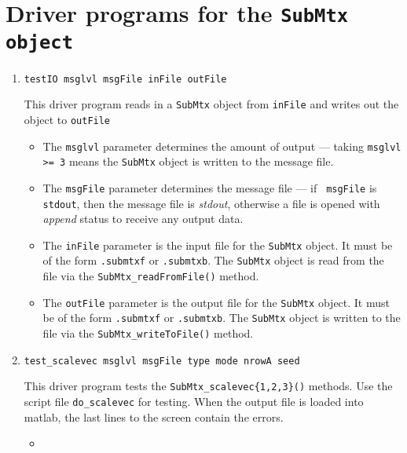\par
\section{Driver programs for the {\tt SubMtx object}}
\label{section:SubMtx:drivers}
\par
\begin{enumerate}
\item
\begin{verbatim}
testIO msglvl msgFile inFile outFile
\end{verbatim}
This driver program reads in a {\tt SubMtx} object from {\tt inFile}
and writes out the object to {\tt outFile}
\par
\begin{itemize}
\item
The {\tt msglvl} parameter determines the amount of output ---
taking {\tt msglvl >= 3} means the {\tt SubMtx} object is written
to the message file.
\item
The {\tt msgFile} parameter determines the message file --- if {\tt
msgFile} is {\tt stdout}, then the message file is {\it stdout},
otherwise a file is opened with {\it append} status to receive any
output data.
\item
The {\tt inFile} parameter is the input file for the {\tt SubMtx}
object. It must be of the form {\tt *.submtxf} or {\tt *.submtxb}.
The {\tt SubMtx} object is read from the file via the
{\tt SubMtx\_readFromFile()} method.
\item
The {\tt outFile} parameter is the output file for the {\tt SubMtx}
object. It must be of the form {\tt *.submtxf} or {\tt *.submtxb}.
The {\tt SubMtx} object is written to the file via the
{\tt SubMtx\_writeToFile()} method.
\end{itemize}
\item
\begin{verbatim}
test_scalevec msglvl msgFile type mode nrowA seed
\end{verbatim}
This driver program tests 
the {\tt SubMtx\_scalevec\{1,2,3\}()} methods.
Use the script file {\tt do\_scalevec} for testing.
When the output file is loaded into matlab,
the last lines to the screen contain the errors.
\par
\begin{itemize}
\item

\end{itemize}
\end{enumerate}
